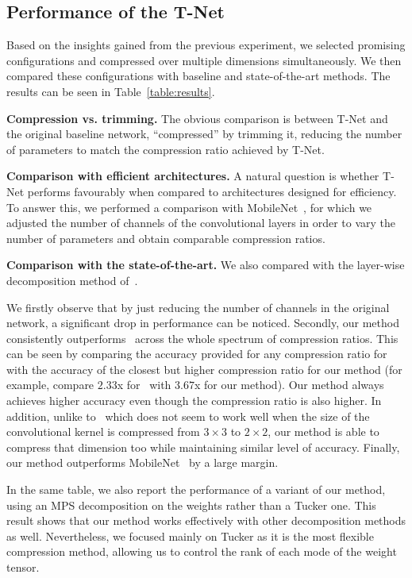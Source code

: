 \documentclass[10pt,twocolumn,letterpaper]{article}
\begin{document}
\subsection{Performance of the T-Net}
Based on the insights gained from the previous experiment, we selected promising configurations and compressed over multiple dimensions simultaneously. We then compared these configurations with baseline and state-of-the-art methods. The results can be seen in Table~\ref{table:results}. 

\textbf{Compression vs. trimming.} The obvious comparison is between T-Net and the original baseline network, ``compressed'' by trimming it, reducing the number of parameters to match the compression ratio achieved by T-Net.

\textbf{Comparison with efficient architectures.} A natural question is whether T-Net performs favourably when compared to architectures designed for efficiency. To answer this, we performed a comparison with MobileNet~\cite{mobilenets}, for which we adjusted the number of channels of the convolutional layers in order to vary the number of parameters and obtain comparable compression ratios.

\textbf{Comparison with the state-of-the-art.} We also compared 
with the layer-wise decomposition method of~\cite{yong2015compression}. 

We firstly observe that by just reducing the number of channels in the original network, a significant drop in performance can be noticed. Secondly, our method consistently outperforms~\cite{yong2015compression} across the whole spectrum of compression ratios. This can be seen by comparing the accuracy provided for any compression ratio for~\cite{yong2015compression} with the accuracy of the closest but higher compression ratio for our method (for example, compare $2.33$x for~\cite{yong2015compression} with $3.67$x for our method). Our method always achieves higher accuracy even though the compression ratio is also higher. In addition, unlike to~\cite{yong2015compression} which does not seem to work well when the size of the convolutional kernel is compressed from \(3 \times 3\) to \(2 \times 2\), our method is able to compress that dimension too while maintaining similar level of accuracy. Finally, our method outperforms MobileNet~\cite{mobilenets} by a large margin. 


In the same table, we also report the performance of a variant of our method, using an MPS decomposition on the weights rather than a Tucker one. This result shows that our method works effectively with other decomposition methods as well. Nevertheless, we focused mainly on Tucker as it is the most flexible compression method, allowing us to control the rank of each mode of the weight tensor.
\end{document}
